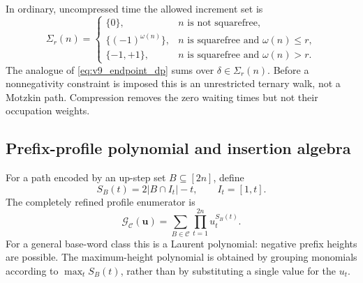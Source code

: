\documentclass[11pt]{amsart}
\numberwithin{equation}{section}
\theoremstyle{plain}
\theoremstyle{definition}
\theoremstyle{remark}
\begin{document}
In ordinary, uncompressed time the allowed increment set is
\begin{equation}
\Sigma_r(n)=
\begin{cases}
\{0\},& n\text{ is not squarefree},\\
\{(-1)^{\omega(n)}\},& n\text{ is squarefree and }\omega(n)\le r,\\
\{-1,+1\},& n\text{ is squarefree and }\omega(n)>r.
\end{cases}
\label{eq:v9_ordinary_increment_set}
\end{equation}
The analogue of \eqref{eq:v9_endpoint_dp} sums over
$\delta\in\Sigma_r(n)$.  Before a nonnegativity constraint is imposed this is
an unrestricted ternary walk, not a Motzkin path.  Compression removes the
zero waiting times but not their occupation weights.

\subsection{Prefix-profile polynomial and insertion algebra}

For a path encoded by an up-step set $B\subseteq[2n]$, define
\begin{equation}
S_B(t)=2|B\cap I_t|-t,\qquad I_t=[1,t].
\label{eq:v9_prefix_profile}
\end{equation}
The completely refined profile enumerator is
\begin{equation}
\boxed{
\mathcal G_{\mathcal C}(\mathbf u)
=\sum_{B\in\mathcal C}\prod_{t=1}^{2n}u_t^{S_B(t)}}.
\label{eq:v9_profile_polynomial}
\end{equation}
For a general base-word class this is a Laurent polynomial: negative prefix
heights are possible.  The maximum-height polynomial is obtained by grouping
monomials according to $\max_t S_B(t)$, rather than by substituting a single
value for the $u_t$.
\end{document}
